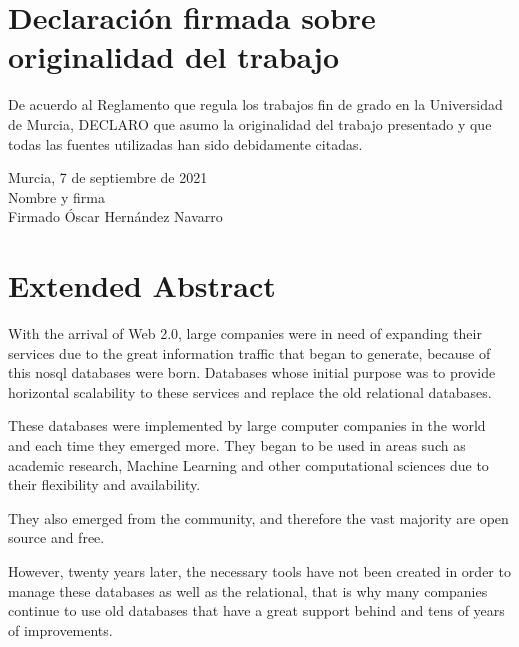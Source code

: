 \chapter*{Declaración firmada sobre originalidad del
  trabajo\label{cap:orginalidad}}

De acuerdo al Reglamento que regula los trabajos fin de grado en la
Universidad de Murcia, DECLARO que asumo la originalidad del trabajo
presentado y que todas las fuentes utilizadas han sido debidamente citadas.

\vspace{10em}

\begin{raggedleft}
Murcia, 7 de septiembre de 2021\\

Nombre y firma\\

Firmado Óscar Hernández Navarro\\

\end{raggedleft}

\chapter*{Extended Abstract\label{00Abstractsummary}}
With the arrival of Web 2.0, large companies were in need of expanding their services due to the great information traffic that began to generate, because of this nosql databases were born. Databases whose initial purpose was to provide horizontal scalability to these services and replace the old relational databases.

These databases were implemented by large computer companies in the world and each time they emerged more. They began to be used in areas such as academic research, Machine Learning and other computational sciences due to their flexibility and availability.

They also emerged from the community, and therefore the vast majority are open source and free.

However, twenty years later, the necessary tools have not been created in order to manage these databases as well as the relational, that is why many companies continue to use old databases that have a great support behind and tens of years of improvements.


